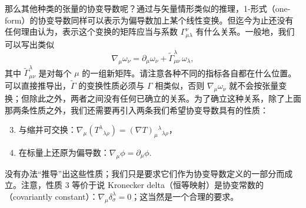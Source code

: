 那么其他种类的张量的协变导数呢？通过与矢量情形类似的推理，1-形式（one-form）的协变导数同样可以表示为偏导数加上某个线性变换。但迄今为止还没有任何理由认为，表示这个变换的矩阵应当与系数 $\Gamma^\nu_{\mu\lambda}$ 有什么关系。一般地，我们可以写出类似
\begin{equation*}
\nabla_\mu\omega_\nu = \partial_\mu\omega_\nu + \widetilde{\Gamma}^\lambda_{\mu\nu}\,\omega_\lambda,
\tag{3.11}
\end{equation*}
其中 $\widetilde{\Gamma}^\lambda_{\mu\nu}$ 是对每个 $\mu$ 的一组新矩阵。请注意各种不同的指标各自都在什么位置。可以直接推导出，$\widetilde{\Gamma}$ 的变换性质必须与 $\Gamma$ 相类似，否则 $\nabla_\mu\omega_\nu$ 就不会按张量变换；但除此之外，两者之间没有任何已确立的关系。为了确立这种关系，除了上面那两条性质之外，我们还需要再引入两条我们希望协变导数具有的性质：
\begin{enumerate}
\setcounter{enumi}{2}
\item 与缩并可交换：$\nabla_\mu(T^\lambda{}_{\lambda\rho}) = (\nabla T)_\mu{}^\lambda{}_{\lambda\rho}$，
\item 在标量上还原为偏导数：$\nabla_\mu\phi = \partial_\mu\phi$.
\end{enumerate}

没有办法“推导”出这些性质；我们只是要求它们作为协变导数定义的一部分而成立。注意，性质 3 等价于说 Kronecker delta（恒等映射）是协变常数的（covariantly constant）：$\nabla_\mu\delta^\lambda_\sigma = 0$；这当然是一个合理的要求。

